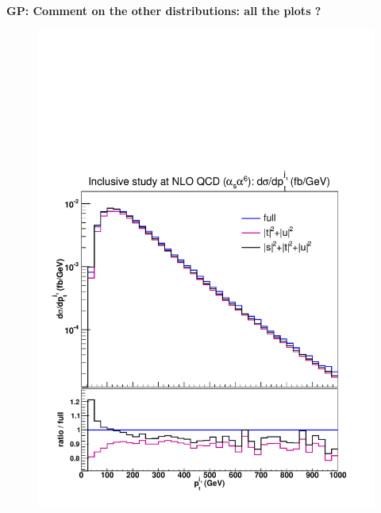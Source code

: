 {\bf GP: Comment on the other distributions: all the plots ?}
\begin{figure}[hbt]
\centering 
{\includegraphics[scale=0.35]{figures/scanfigures/ptj1_nlo.pdf}}

\end{figure}
